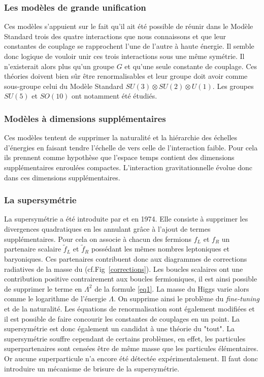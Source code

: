 \subsubsection{Les modèles de grande unification}
Ces modèles s'appuient sur le fait qu'il ait été possible de réunir dans le Modèle Standard trois des quatre interactions que nous connaissons et que leur constantes de couplage se rapprochent l'une de l'autre à haute énergie. Il semble donc logique de vouloir unir ces trois interactions sous une même symétrie. Il n'existerait alors plus qu'un groupe $G$ et qu'une seule constante de couplage. Ces théories doivent bien sûr être renormalisables et leur groupe doit avoir comme sous-groupe celui du Modèle Standard $SU(3)\otimes SU(2) \otimes U(1)$. Les groupes $SU(5)$ et $SO(10)$ ont notamment été étudiés.

\subsubsection{Modèles à dimensions supplémentaires}
Ces modèles tentent de supprimer la naturalité et la hiérarchie des échelles d'énergies en faisant tendre l'échelle de  vers celle de l'interaction faible. Pour cela ils prennent comme hypothèse que l'espace temps contient des dimensions supplémentaires enroulées compactes. L'interaction gravitationnelle évolue donc dans ces dimensions supplémentaires.

\subsubsection{La supersymétrie}
La supersymétrie a été introduite par  et  en \num{1974}. Elle consiste à supprimer les divergences quadratiques en les annulant grâce à l'ajout de termes supplémentaires. Pour cela on associe à chacun des fermions $f_{L}$ et $f_{R}$ un partenaire scalaire $\tilde{f}_{L}$ et $\tilde{f}_{R}$ possédant les mêmes nombres leptoniques et baryoniques. Ces partenaires contribuent donc aux diagrammes de corrections radiatives de la masse du  (cf.Fig~\ref{corrections}). Les boucles scalaires ont une contribution positive contrairement aux boucles fermioniques, il est ainsi possible de supprimer le terme en $\Lambda^2$ de la formule \ref{eq1}. La masse du Higgs varie alors comme le logarithme de l'énergie $\Lambda$. On supprime ainsi le problème du \textit{fine-tuning} et de la naturalité. Les équations de renormalisation sont également modifiées et il est possible de faire concourir les constantes de couplages en un point. La supersymétrie est donc également un candidat à une théorie du "tout". La supersymétrie souffre cependant de certains problèmes, en effet, les particules superpartenaires sont censées être de même masse que les particules élémentaires. Or aucune superparticule n'a encore été détectée expérimentalement. Il faut donc introduire un mécanisme de brisure de la supersymétrie.

